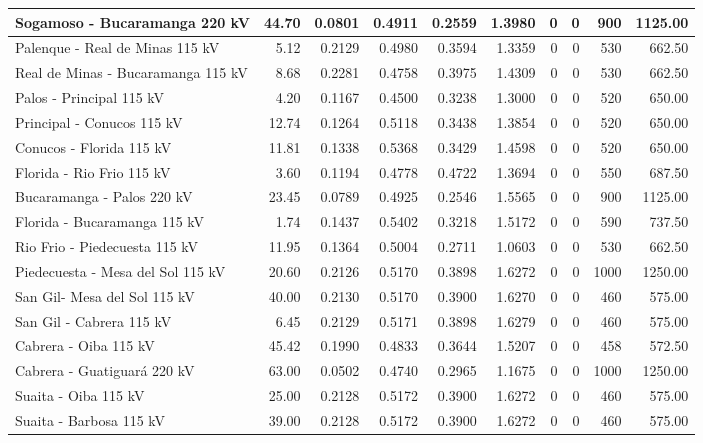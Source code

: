 \documentclass[12pt]{article}
\begin{document}
\begin{center}
\begin{longtable}{|p{5.8cm}|r|r|r|r|r|r|r|r|r|}
\hline
Sogamoso - Bucaramanga 220 kV & 44.70 & 0.0801 & 0.4911 & 0.2559 & 1.3980 & 0 & 0 & 900 & 1125.00 \\
\hline
Palenque - Real de Minas 115 kV & 5.12 & 0.2129 & 0.4980 & 0.3594 & 1.3359 & 0 & 0 & 530 & 662.50 \\
\hline
Real de Minas - Bucaramanga 115 kV & 8.68 & 0.2281 & 0.4758 & 0.3975 & 1.4309 & 0 & 0 & 530 & 662.50 \\
\hline
Palos - Principal 115 kV & 4.20 & 0.1167 & 0.4500 & 0.3238 & 1.3000 & 0 & 0 & 520 & 650.00 \\
\hline
Principal - Conucos 115 kV & 12.74 & 0.1264 & 0.5118 & 0.3438 & 1.3854 & 0 & 0 & 520 & 650.00 \\
\hline
Conucos - Florida 115 kV & 11.81 & 0.1338 & 0.5368 & 0.3429 & 1.4598 & 0 & 0 & 520 & 650.00 \\
\hline
Florida - Rio Frio 115 kV & 3.60 & 0.1194 & 0.4778 & 0.4722 & 1.3694 & 0 & 0 & 550 & 687.50 \\
\hline
Bucaramanga - Palos 220 kV & 23.45 & 0.0789 & 0.4925 & 0.2546 & 1.5565 & 0 & 0 & 900 & 1125.00 \\
\hline
Florida - Bucaramanga 115 kV & 1.74 & 0.1437 & 0.5402 & 0.3218 & 1.5172 & 0 & 0 & 590 & 737.50 \\
\hline
Rio Frio - Piedecuesta 115 kV & 11.95 & 0.1364 & 0.5004 & 0.2711 & 1.0603 & 0 & 0 & 530 & 662.50 \\
\hline
Piedecuesta - Mesa del Sol 115 kV & 20.60 & 0.2126 & 0.5170 & 0.3898 & 1.6272 & 0 & 0 & 1000 & 1250.00 \\
\hline
San Gil- Mesa del Sol 115 kV & 40.00 & 0.2130 & 0.5170 & 0.3900 & 1.6270 & 0 & 0 & 460 & 575.00 \\
\hline
San Gil - Cabrera 115 kV & 6.45 & 0.2129 & 0.5171 & 0.3898 & 1.6279 & 0 & 0 & 460 & 575.00 \\
\hline
Cabrera - Oiba 115 kV & 45.42 & 0.1990 & 0.4833 & 0.3644 & 1.5207 & 0 & 0 & 458 & 572.50 \\
\hline
Cabrera - Guatiguará 220 kV & 63.00 & 0.0502 & 0.4740 & 0.2965 & 1.1675 & 0 & 0 & 1000 & 1250.00 \\
\hline
Suaita - Oiba 115 kV & 25.00 & 0.2128 & 0.5172 & 0.3900 & 1.6272 & 0 & 0 & 460 & 575.00 \\
\hline
Suaita - Barbosa 115 kV & 39.00 & 0.2128 & 0.5172 & 0.3900 & 1.6272 & 0 & 0 & 460 & 575.00 \\

\end{longtable}
\end{center}
\end{document}
